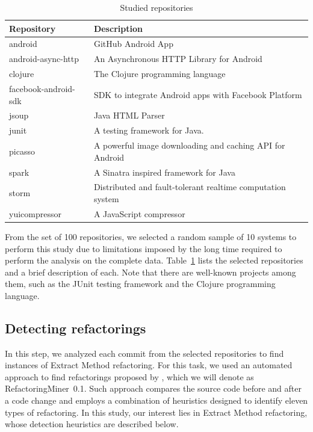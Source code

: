 \begin{table}[bp]\centering
\renewcommand{\arraystretch}{1.3}
\caption{Studied repositories}
\begin{tabular}{@{}ll@{}}\toprule
Repository & Description \\
\midrule
android & GitHub Android App \\
android-async-http & An Asynchronous HTTP Library for Android \\
clojure & The Clojure programming language \\
facebook-android-sdk & SDK to integrate Android apps with Facebook Platform \\
jsoup & Java HTML Parser \\ %
junit & A testing framework for Java. \\
picasso & A powerful image downloading and caching API for Android \\
spark & A Sinatra inspired framework for Java \\
storm & Distributed and fault-tolerant realtime computation system \\
yuicompressor & A JavaScript compressor \\
\bottomrule
\end{tabular}
\label{ch5:tsystems}
\end{table}

From the set of 100 repositories, we selected a random sample of 10 systems to perform this study due to limitations imposed by the long time required to perform the analysis on the complete data. Table~\ref{ch5:tsystems} lists the selected repositories and a brief description of each. Note that there are well-known projects among them, such as the JUnit testing framework and the Clojure programming language.

\subsection{Detecting refactorings}
\label{srefactoringdetection}

In this step, we analyzed each commit from the selected repositories to find instances of Extract Method refactoring. For this task, we used an automated approach to find refactorings proposed by \cite{tsantalis_empiricalstudy}, which we will denote as RefactoringMiner~0.1. Such approach compares the source code before and after a code change and employs a combination of heuristics designed to identify eleven types of refactoring.
In this study, our interest lies in Extract Method refactoring, whose detection heuristics are described below.

